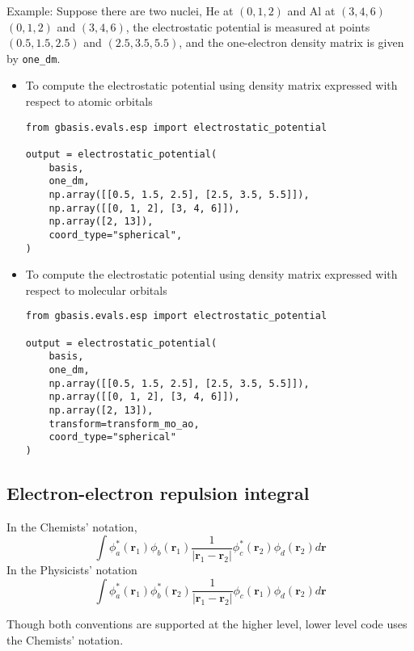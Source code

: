\documentclass[letterpaper]{article}
\begin{document}
Example:
Suppose there are two nuclei, He at $(0, 1, 2)$ and Al at $(3, 4, 6)$
$(0, 1, 2)$ and $(3, 4, 6)$, the electrostatic potential is measured at
points $(0.5, 1.5, 2.5)$ and $(2.5, 3.5, 5.5)$, and the one-electron density
matrix is given by \verb|one_dm|.
\begin{itemize}
\item To compute the electrostatic potential using density matrix expressed with
  respect to atomic orbitals
  \begin{lstlisting}[xleftmargin=-25pt]
from gbasis.evals.esp import electrostatic_potential

output = electrostatic_potential(
    basis,
    one_dm,
    np.array([[0.5, 1.5, 2.5], [2.5, 3.5, 5.5]]),
    np.array([[0, 1, 2], [3, 4, 6]]),
    np.array([2, 13]),
    coord_type="spherical",
)
\end{lstlisting}
\item To compute the electrostatic potential using density matrix expressed with
  respect to molecular orbitals
  \begin{lstlisting}[xleftmargin=-25pt]
from gbasis.evals.esp import electrostatic_potential

output = electrostatic_potential(
    basis,
    one_dm,
    np.array([[0.5, 1.5, 2.5], [2.5, 3.5, 5.5]]),
    np.array([[0, 1, 2], [3, 4, 6]]),
    np.array([2, 13]),
    transform=transform_mo_ao,
    coord_type="spherical"
)
\end{lstlisting}
\end{itemize}
\subsection{Electron-electron repulsion integral}
In the Chemists' notation,
\begin{equation}
  \label{eq:elec_repulsion}
  \int \phi^*_a(\mathbf{r}_1) \phi_b(\mathbf{r}_1)
  \frac{1}{|\mathbf{r}_1 - \mathbf{r}_2|}
  \phi^*_c(\mathbf{r}_2) \phi_d(\mathbf{r}_2) d\mathbf{r}
\end{equation}
In the Physicists' notation
\begin{equation}
  \label{eq:elec_repulsion_phys}
  \int \phi^*_a(\mathbf{r}_1) \phi^*_b(\mathbf{r}_2)
  \frac{1}{|\mathbf{r}_1 - \mathbf{r}_2|}
  \phi_c(\mathbf{r}_1) \phi_d(\mathbf{r}_2) d\mathbf{r}
\end{equation}

Though both conventions are supported at the higher level, lower level code uses
the Chemists' notation.
\end{document}
